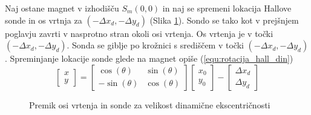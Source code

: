 Naj ostane magnet v izhodišču $S_m(0,0)$ in naj se spremeni lokacija Hallove sonde in os vrtnja za $(-\Delta x_d,-\Delta y_d)$ (Slika \ref{fig:def_din_eksbac}). Sondo se tako kot v prejšnjem poglavju zavrti 
v nasprotno stran okoli osi vrtenja. Os vrtenja je v točki $(-\Delta x_d,-\Delta y_d)$. Sonda se giblje po krožnici s središčem v točki $(-\Delta x_d,-\Delta y_d)$. Spreminjanje lokacije sonde glede na 
magnet opiše (\ref{equ:rotacija_hall_din})
\begin{equation}
\label{equ:rotacija_hall_din}
\begin{bmatrix} x\\y \end{bmatrix}=
\begin{bmatrix} \cos(\theta)&\sin(\theta)\\-\sin(\theta)&\cos(\theta) \end{bmatrix}
\begin{bmatrix} x_0\\y_0 \end{bmatrix}
-
\begin{bmatrix} \Delta x_d\\\Delta y_d \end{bmatrix}
\end{equation}
\begin{figure}[!ht]
	\hspace*{3.5cm}   
	\caption{Premik osi vrtenja in sonde za velikost dinamične ekscentričnosti}
	\label{fig:def_din_eksbac}
\end{figure}
